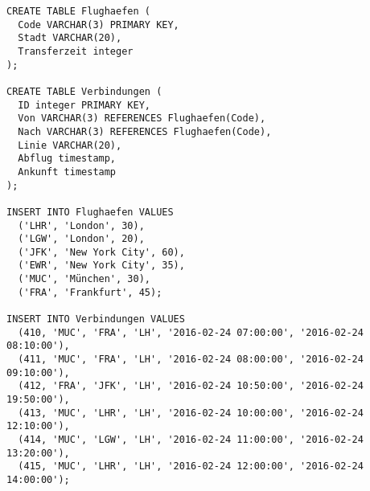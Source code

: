 \documentclass{bschlangaul-aufgabe}
\begin{document}
\begin{verbatim}
CREATE TABLE Flughaefen (
  Code VARCHAR(3) PRIMARY KEY,
  Stadt VARCHAR(20),
  Transferzeit integer
);

CREATE TABLE Verbindungen (
  ID integer PRIMARY KEY,
  Von VARCHAR(3) REFERENCES Flughaefen(Code),
  Nach VARCHAR(3) REFERENCES Flughaefen(Code),
  Linie VARCHAR(20),
  Abflug timestamp,
  Ankunft timestamp
);

INSERT INTO Flughaefen VALUES
  ('LHR', 'London', 30),
  ('LGW', 'London', 20),
  ('JFK', 'New York City', 60),
  ('EWR', 'New York City', 35),
  ('MUC', 'München', 30),
  ('FRA', 'Frankfurt', 45);

INSERT INTO Verbindungen VALUES
  (410, 'MUC', 'FRA', 'LH', '2016-02-24 07:00:00', '2016-02-24 08:10:00'),
  (411, 'MUC', 'FRA', 'LH', '2016-02-24 08:00:00', '2016-02-24 09:10:00'),
  (412, 'FRA', 'JFK', 'LH', '2016-02-24 10:50:00', '2016-02-24 19:50:00'),
  (413, 'MUC', 'LHR', 'LH', '2016-02-24 10:00:00', '2016-02-24 12:10:00'),
  (414, 'MUC', 'LGW', 'LH', '2016-02-24 11:00:00', '2016-02-24 13:20:00'),
  (415, 'MUC', 'LHR', 'LH', '2016-02-24 12:00:00', '2016-02-24 14:00:00');
\end{verbatim}
\end{document}
